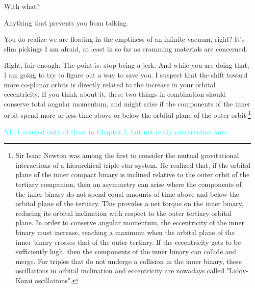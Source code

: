 \documentclass[main.tex]{subfiles}
\begin{document}
\par \Alcyone With what?

\par \Celaeno Anything that prevents you from talking.  

\par \Alcyone You do realize we are floating in the emptiness of an infinite vacuum, right?  It's slim pickings I am afraid, at least in so far as cramming materials are concerned.

\par \Celaeno Right, fair enough.  The point is:  stop being a jerk.  And while you are doing that, I am going to try to figure out a way to save you.  I suspect that the shift toward more co-planar orbits is directly related to the increase in your orbital eccentricity.  If you think about it, these two things in combination should conserve total angular momentum, and might arise if the components of the inner orbit spend more or less time above or below the orbital plane of the outer orbit.\footnote{Sir Isaac Newton was among the first to consider the mutual gravitational interactions of a hierarchical triple star system.  He realized that, if the orbital plane of the inner compact binary is inclined relative to the outer orbit of the tertiary companion, then an asymmetry can arise where the components of the inner binary do not spend equal amounts of time above and below the orbital plane of the tertiary.  This provides a net torque on the inner binary, reducing its orbital inclination with respect to the outer tertiary orbital plane.  In order to conserve angular momentum, the eccentricity of the inner binary must increase, reaching a maximum when the orbital plane of the inner binary crosses that of the outer tertiary.  If the eccentricity gets to be sufficiently high, then the components of the inner binary can collide and merge.  For triples that do not undergo a collision in the inner binary, these oscillations in orbital inclination and eccentricity are nowadays called "Lidov-Kozai oscillations".} 

\textcolor{cyan}{NL:  I covered both of these in Chapter 2, but not really conservation laws.}

\end{document}
